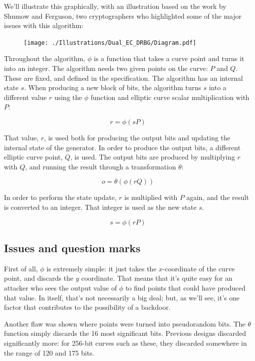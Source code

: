 \documentclass[11pt,ebook,table,dvipsnames]{memoir}
\begin{document}
We'll illustrate this graphically, with an illustration based on the
work by Shumow and Ferguson, two cryptographers who highlighted some
of the major issues with this algorithm:

\begin{figure}
\centering
\texttt{[image: ./Illustrations/Dual\_EC\_DRBG/Diagram.pdf]}
\end{figure}

Throughout the algorithm, $\phi$ is a function that takes a curve
point and turns it into an integer. The algorithm needs two given
points on the curve: $P$ and $Q$. These are fixed, and defined in the
specification. The algorithm has an internal state $s$. When producing
a new block of bits, the algorithm turns $s$ into a different value
$r$ using the $\phi$ function and elliptic curve scalar multiplication
with $P$:

\[
r = \phi(sP)
\]

That value, $r$, is used both for producing the output bits and
updating the internal state of the generator. In order to produce the
output bits, a different elliptic curve point, $Q$, is used. The
output bits are produced by multiplying $r$ with $Q$, and running the
result through a transformation $\theta$:

\[
o = \theta(\phi(rQ))
\]

In order to perform the state update, $r$ is multiplied with $P$
again, and the result is converted to an integer. That integer is used
as the new state $s$.

\[
s = \phi(rP)
\]
\subsection{Issues and question marks}
\label{sec-2-10-5-3}

First of all, $\phi$ is extremely simple: it just takes the
$x$-coordinate of the curve point, and discards the $y$ coordinate.
That means that it's quite easy for an attacker who sees the output
value of $\phi$ to find points that could have produced that value. In
itself, that's not necessarily a big deal; but, as we'll see, it's one
factor that contributes to the possibility of a backdoor.

Another flaw was shown where points were turned into pseudorandom
bits. The $\theta$ function simply discards the 16 most significant
bits. Previous designs discarded significantly more: for 256-bit
curves such as these, they discarded somewhere in the range of 120 and
175 bits.
\end{document}
